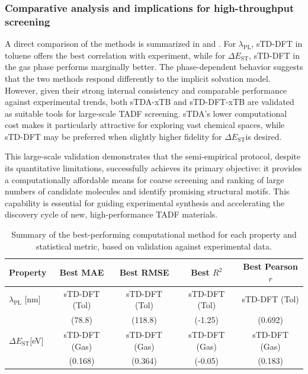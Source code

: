 \documentclass[journal=jcisd8,manuscript=article,keywords=true]{achemso}
\newcommand{\deltaest}{$\Delta E_{\text{ST}}$}
\begin{document}
\subsubsection{Comparative analysis and implications for high-throughput screening}

A direct comparison of the methods is summarized in  and
. For $\lambda_{\text{PL}}$, sTD-DFT in toluene offers the
best correlation with experiment, while for \deltaest, sTD-DFT in the gas phase performs
marginally better. The phase-dependent behavior suggests that the two methods respond
differently to the implicit solvation model. However, given their strong internal
consistency and comparable performance against experimental trends, both sTDA-xTB and
sTD-DFT-xTB are validated as suitable tools for large-scale TADF screening. sTDA's lower
computational cost makes it particularly attractive for exploring vast chemical spaces,
while sTD-DFT may be preferred when slightly higher fidelity for \deltaest is desired.

This large-scale validation demonstrates that the semi-empirical protocol,
despite its quantitative limitations, successfully achieves its primary objective: it
provides a computationally affordable means for coarse screening and ranking of large numbers of candidate
molecules and identify promising structural motifs. This capability is essential for
guiding experimental synthesis and accelerating the discovery cycle of new,
high-performance TADF materials.

\begin{table}[!ht]
\centering
\caption{Summary of the best-performing computational method for each property and
statistical metric, based on validation against experimental data.}
\label{tab:comparative-summary}
\begin{tabular}{l *{4}{c}}
	\toprule
	{Property}                 & {Best MAE}    &  {Best RMSE}  & {Best $R^2$}  & {Best
Pearson $r$} \\ \midrule
	$\lambda_{\text{PL}}$ [\unit{\nano\meter}] & sTD-DFT (Tol) & sTD-DFT (Tol) & sTD-DFT (Tol) &
sTD-DFT (Tol)    \\
	                           & (78.8)        &    (118.8)    &    (-1.25)    &
(0.692)       \\ \midrule
	\deltaest [\unit{\electronvolt}]             & sTD-DFT (Gas) & sTD-DFT (Gas) & sTD-DFT (Gas) &
sTD-DFT (Gas)    \\
	                           & (0.168)       &    (0.364)    &    (-0.05)    &
(0.183)       \\ \bottomrule
\end{tabular}
\end{table}
\end{document}
